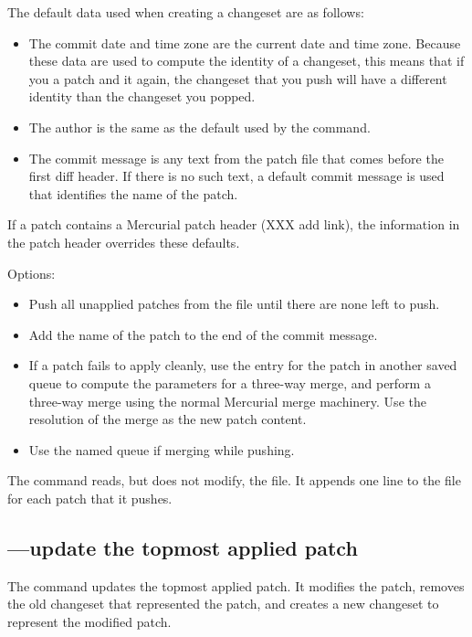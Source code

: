 The default data used when creating a changeset are as follows:
\begin{itemize}
\item The commit date and time zone are the current date and time
  zone.  Because these data are used to compute the identity of a
  changeset, this means that if you  a patch and
   it again, the changeset that you push will have a
  different identity than the changeset you popped.
\item The author is the same as the default used by the 
  command.
\item The commit message is any text from the patch file that comes
  before the first diff header.  If there is no such text, a default
  commit message is used that identifies the name of the patch.
\end{itemize}
If a patch contains a Mercurial patch header (XXX add link), the
information in the patch header overrides these defaults.

Options:
\begin{itemize}
\item[\hgopt{qpush}{-a}] Push all unapplied patches from the
   file until there are none left to push.
\item[\hgopt{qpush}{-l}] Add the name of the patch to the end
  of the commit message.
\item[\hgopt{qpush}{-m}] If a patch fails to apply cleanly, use the
  entry for the patch in another saved queue to compute the parameters
  for a three-way merge, and perform a three-way merge using the
  normal Mercurial merge machinery.  Use the resolution of the merge
  as the new patch content.
\item[\hgopt{qpush}{-n}] Use the named queue if merging while pushing.
\end{itemize}

The  command reads, but does not modify, the
 file.  It appends one line to the 
file for each patch that it pushes.

\subsection{---update the topmost applied patch}

The  command updates the topmost applied patch.  It
modifies the patch, removes the old changeset that represented the
patch, and creates a new changeset to represent the modified patch.

